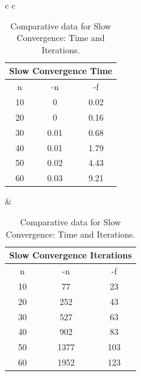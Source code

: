 \begin{table}[h!]
	\centering
	\begin{tabular}{c c}
		\begin{minipage}{.5\textwidth}
			\centering
			\begin{tabular}{| c | c | c |}
				\hline
				\multicolumn{3}{|c|}{Slow Convergence Time} \\ \hline
				n  & -n   & -f                              \\ \hline
				10 & 0    & 0.02                            \\ \hline
				20 & 0    & 0.16                            \\ \hline
				30 & 0.01 & 0.68                            \\ \hline
				40 & 0.01 & 1.79                            \\ \hline
				50 & 0.02 & 4.43                            \\ \hline
				60 & 0.03 & 9.21                            \\ \hline
			\end{tabular}
		\end{minipage} &
		\begin{minipage}{.5\textwidth}
			\centering
			\begin{tabular}{| c | c | c |}
				\hline
				\multicolumn{3}{|c|}{Slow Convergence Iterations} \\ \hline
				n  & -n   & -f                                    \\ \hline
				10 & 77   & 23                                    \\ \hline
				20 & 252  & 43                                    \\ \hline
				30 & 527  & 63                                    \\ \hline
				40 & 902  & 83                                    \\ \hline
				50 & 1377 & 103                                   \\ \hline
				60 & 1952 & 123                                   \\ \hline
			\end{tabular}
		\end{minipage}
	\end{tabular}
	\caption{Comparative data for Slow Convergence: Time and Iterations.}
	\label{tab:slow}
\end{table}
